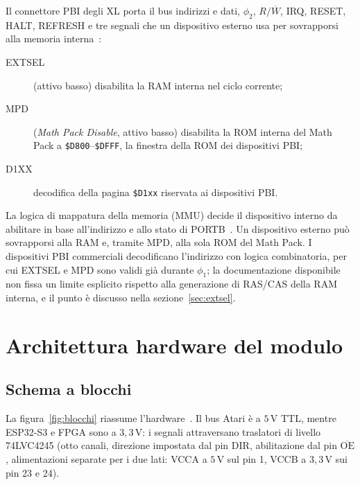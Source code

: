 \documentclass[11pt,a4paper,twoside,openright]{report}
\newcommand{\sig}[1]{\textsf{#1}}
\newcommand{\hex}[1]{\texttt{\$#1}}
\begin{document}
Il connettore PBI degli XL porta il bus indirizzi e dati, $\phi_2$, $R/\overline{W}$,
\sig{IRQ}, \sig{RESET}, \sig{HALT}, \sig{REFRESH} e tre segnali che un dispositivo esterno
usa per sovrapporsi alla memoria interna~\cite[cap.~10]{ahrm}:
\begin{description}
  \item[\sig{EXTSEL}] (attivo basso) disabilita la RAM interna nel ciclo corrente;
  \item[\sig{MPD}] (\emph{Math Pack Disable}, attivo basso) disabilita la ROM interna del
        Math Pack a \hex{D800}--\hex{DFFF}, la finestra della ROM dei dispositivi PBI;
  \item[\sig{D1XX}] decodifica della pagina \hex{D1xx} riservata ai dispositivi PBI.
\end{description}
La logica di mappatura della memoria (MMU) decide il dispositivo interno da abilitare in
base all'indirizzo e allo stato di PORTB~\cite[§3.4]{ahrm}. Un dispositivo esterno può
sovrapporsi alla RAM e, tramite \sig{MPD}, alla sola ROM del Math Pack. I dispositivi PBI
commerciali decodificano l'indirizzo con logica combinatoria, per cui \sig{EXTSEL} e
\sig{MPD} sono validi già durante $\phi_1$; la documentazione disponibile non fissa un
limite esplicito rispetto alla generazione di \sig{RAS}/\sig{CAS} della RAM interna, e il
punto è discusso nella sezione~\ref{sec:extsel}.

\chapter{Architettura hardware del modulo}
\label{cap:hw}

\section{Schema a blocchi}

La figura~\ref{fig:blocchi} riassume l'hardware~\cite{pinmap,hwreq}. Il bus Atari è a
$5\,\mathrm{V}$ TTL, mentre ESP32-S3 e FPGA sono a $3{,}3\,\mathrm{V}$: i segnali
attraversano traslatori di livello 74LVC4245 (otto canali, direzione impostata dal pin
\sig{DIR}, abilitazione dal pin \sig{$\overline{\text{OE}}$}, alimentazioni separate per
i due lati: VCCA a $5\,\mathrm{V}$ sul pin 1, VCCB a $3{,}3\,\mathrm{V}$ sui pin 23 e 24).
\end{document}
